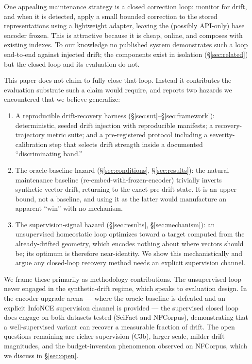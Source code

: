 \documentclass[12pt]{article}
\begin{document}
One appealing maintenance strategy is a closed correction loop: monitor for drift, and when it is detected, apply a small bounded correction to the stored representations using a lightweight adapter, leaving the (possibly API-only) base encoder frozen. This is attractive because it is cheap, online, and composes with existing indexes. To our knowledge no published system demonstrates such a loop end-to-end against injected drift; the components exist in isolation (\S\ref{sec:related}) but the closed loop and its evaluation do not.

This paper does not claim to fully close that loop. Instead it contributes the evaluation substrate such a claim would require, and reports two hazards we encountered that we believe generalize:

\begin{enumerate}
  \item A reproducible drift-recovery harness (\S\ref{sec:sut}--\S\ref{sec:framework}): deterministic, seeded drift injection with reproducible manifests; a recovery-trajectory metric suite; and a pre-registered protocol including a severity-calibration step that selects drift strength inside a documented ``discriminating band.''
  \item The oracle-baseline hazard (\S\ref{sec:conditions}, \S\ref{sec:results}): the natural maintenance baseline (re-embed-with-frozen-encoder) trivially inverts synthetic vector drift, returning to the exact pre-drift state. It is an upper bound, not a baseline, and using it as the latter would manufacture an apparent ``win'' with no mechanism.
  \item The supervision-signal hazard (\S\ref{sec:results}, \S\ref{sec:mechanism}): an unsupervised homeostatic loop optimizes toward a target computed from the already-drifted geometry, which encodes nothing about where vectors should be; its optimum is therefore near-identity. We show this mechanistically and argue any closed-loop recovery method needs an explicit supervision channel.
\end{enumerate}

We frame these primarily as methodology contributions. The unsupervised loop never engaged in the synthetic-drift regime, which speaks to evaluation design. In the encoder-upgrade arena --- where the oracle baseline is defeated and an explicit InfoNCE supervision channel is provided --- the supervised closed loop does engage on both datasets tested (SciFact and NFCorpus), demonstrating that a well-supervised variant can recover a measurable fraction of drift. The open questions remaining are richer supervision (C3b), larger scale, milder drift magnitudes, and the budget-inversion phenomenon observed on NFCorpus, which we discuss in \S\ref{sec:open}.
\end{document}
